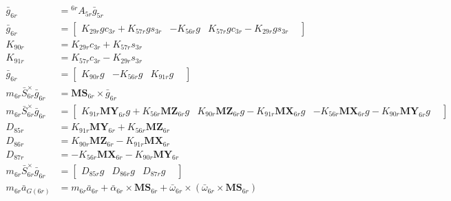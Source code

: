 \begin{align}
 \nonumber \\ 
 \bar{g}_{6r} &= {}^{6r}A_{5r} \bar{g}_{5r} 
 \nonumber \\ 
 \bar{g}_{6r} &= \left[\begin{matrix} K_{29r}gc_{3r} + K_{57r}gs_{3r} & -K_{56r}g & K_{57r}gc_{3r} - K_{29r}gs_{3r} &  \end{matrix}\right] 
 \nonumber \\ 
K_{90r} &= K_{29r}c_{3r} + K_{57r}s_{3r} \nonumber \\
K_{91r} &= K_{57r}c_{3r} - K_{29r}s_{3r} \nonumber \\
 \bar{g}_{6r} &= \left[\begin{matrix} K_{90r}g & -K_{56r}g & K_{91r}g &  \end{matrix}\right] 
 \nonumber \\ 
 m_{6r}\bar{S}_{6r}^{\times}\bar{g}_{6r} &= \mathbf{MS}_{6r} \times \bar{g}_{6r} 
 \nonumber \\ 
 m_{6r}\bar{S}_{6r}^{\times}\bar{g}_{6r} &= \left[\begin{matrix} K_{91r}\mathbf{MY}_{6r}g + K_{56r}\mathbf{MZ}_{6r}g & K_{90r}\mathbf{MZ}_{6r}g - K_{91r}\mathbf{MX}_{6r}g & - K_{56r}\mathbf{MX}_{6r}g - K_{90r}\mathbf{MY}_{6r}g &  \end{matrix}\right] 
 \nonumber \\ 
D_{85r} &= K_{91r}\mathbf{MY}_{6r} + K_{56r}\mathbf{MZ}_{6r} \nonumber \\
D_{86r} &= K_{90r}\mathbf{MZ}_{6r} - K_{91r}\mathbf{MX}_{6r} \nonumber \\
D_{87r} &= - K_{56r}\mathbf{MX}_{6r} - K_{90r}\mathbf{MY}_{6r} \nonumber \\
 m_{6r}\bar{S}_{6r}^{\times}\bar{g}_{6r} &= \left[\begin{matrix} D_{85r}g & D_{86r}g & D_{87r}g &  \end{matrix}\right] 
 \nonumber \\ 
 m_{6r}\bar{a}_{G(6r)} &= m_{6r}\bar{a}_{6r} + \bar\alpha_{6r} \times \mathbf{MS}_{6r} + \bar\omega_{6r} \times \left(\bar\omega_{6r} \times \mathbf{MS}_{6r}\right) 
 \nonumber \\ 

\end{align}
